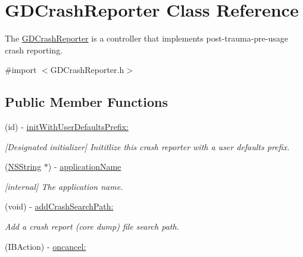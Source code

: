 \hypertarget{interface_g_d_crash_reporter}{
\section{GDCrashReporter Class Reference}
\label{interface_g_d_crash_reporter}
}


The \hyperlink{interface_g_d_crash_reporter}{GDCrashReporter} is a controller that implements post-\/trauma-\/pre-\/usage crash reporting.  


{\ttfamily \#import $<$GDCrashReporter.h$>$}\subsection*{Public Member Functions}
\begin{DoxyCompactItemize}
\item 
\hypertarget{interface_g_d_crash_reporter_a4e95cdc41dd4f481189b71c9fda090fb}{
(id) -\/ \hyperlink{interface_g_d_crash_reporter_a4e95cdc41dd4f481189b71c9fda090fb}{initWithUserDefaultsPrefix:}}
\label{interface_g_d_crash_reporter_a4e95cdc41dd4f481189b71c9fda090fb}

\begin{DoxyCompactList}\small\item\em \mbox{[}Designated initializer\mbox{]} Inititlize this crash reporter with a user defaults prefix. \item\end{DoxyCompactList}\item 
\hypertarget{interface_g_d_crash_reporter_af6f95de8115474758ebb0ff3bfa634f9}{
(\hyperlink{class_n_s_string}{NSString} $\ast$) -\/ \hyperlink{interface_g_d_crash_reporter_af6f95de8115474758ebb0ff3bfa634f9}{applicationName}}
\label{interface_g_d_crash_reporter_af6f95de8115474758ebb0ff3bfa634f9}

\begin{DoxyCompactList}\small\item\em \mbox{[}internal\mbox{]} The application name. \item\end{DoxyCompactList}\item 
\hypertarget{interface_g_d_crash_reporter_a278a856e8c3d8a33d27f3225249560ed}{
(void) -\/ \hyperlink{interface_g_d_crash_reporter_a278a856e8c3d8a33d27f3225249560ed}{addCrashSearchPath:}}
\label{interface_g_d_crash_reporter_a278a856e8c3d8a33d27f3225249560ed}

\begin{DoxyCompactList}\small\item\em Add a crash report (core dump) file search path. \item\end{DoxyCompactList}\item 
\hypertarget{interface_g_d_crash_reporter_acc2e41dd6225c980814136d2ae8bd06b}{
(IBAction) -\/ \hyperlink{interface_g_d_crash_reporter_acc2e41dd6225c980814136d2ae8bd06b}{oncancel:}}
\label{interface_g_d_crash_reporter_acc2e41dd6225c980814136d2ae8bd06b}


\end{DoxyCompactItemize}
